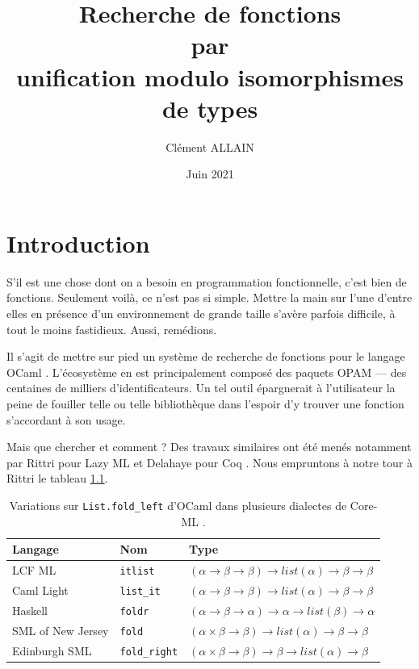 \documentclass[a4paper]{report}
\title{Recherche de fonctions \\ par \\ unification modulo isomorphismes de types}
\author{Clément ALLAIN}
\date{Juin 2021}
\theoremstyle{definition}
\begin{document}
\maketitle

\tableofcontents

\newpage


\chapter{Introduction}

S'il est une chose dont on a besoin en programmation fonctionnelle, c'est bien de fonctions. Seulement voilà, ce n'est pas si simple. Mettre la main sur l'une d'entre elles en présence d'un environnement de grande taille s'avère parfois difficile, à tout le moins fastidieux. Aussi, remédions.

Il s'agit de mettre sur pied un système de recherche de fonctions pour le langage OCaml \cite{OCaml}. L'écosystème en est principalement composé des paquets OPAM --- des centaines de milliers d'identificateurs. Un tel outil épargnerait à l'utilisateur la peine de fouiller telle ou telle bibliothèque dans l'espoir d'y trouver une fonction s'accordant à son usage.

Mais que chercher et comment ? Des travaux similaires ont été menés notamment par Rittri pour Lazy ML \cite{Rittri91, Rittri93} et Delahaye pour Coq \cite{Delahaye}. Nous empruntons à notre tour à Rittri \cite{Rittri91} le tableau \ref{tab_fold}.

\begin{table}[h]
	\centering
	\begin{tabular}{|l|l|l|}
		\hline
			Langage &
			Nom &
			Type
		\\
		\hline
			LCF ML \cite{LCF_ML} &
			\texttt{itlist} &
			$(\alpha \rightarrow \beta \rightarrow \beta) \rightarrow list (\alpha) \rightarrow \beta \rightarrow \beta$
		\\
			Caml Light \cite{Caml_Light} &
			\texttt{list\_it} &
			$(\alpha \rightarrow \beta \rightarrow \beta) \rightarrow list (\alpha) \rightarrow \beta \rightarrow \beta$
		\\
			Haskell \cite{Haskell} &
			\texttt{foldr} &
			$(\alpha \rightarrow \beta \rightarrow \alpha) \rightarrow \alpha \rightarrow list (\beta) \rightarrow \alpha$
		\\
			SML of New Jersey \cite{SML_New_Jersey} &
			\texttt{fold} &
			$(\alpha \times \beta \rightarrow \beta) \rightarrow list (\alpha) \rightarrow \beta \rightarrow \beta$
		\\
			Edinburgh SML \cite{Edinburgh_SML} &
			\texttt{fold\_right} &
			$(\alpha \times \beta \rightarrow \beta) \rightarrow \beta \rightarrow list (\alpha) \rightarrow \beta$
		\\
		\hline
	\end{tabular}
	\caption{\label{tab_fold} Variations sur \texttt{List.fold\_left} d'OCaml dans plusieurs dialectes de Core-ML \cite{Core_ML}.}
\end{table}
\end{document}
